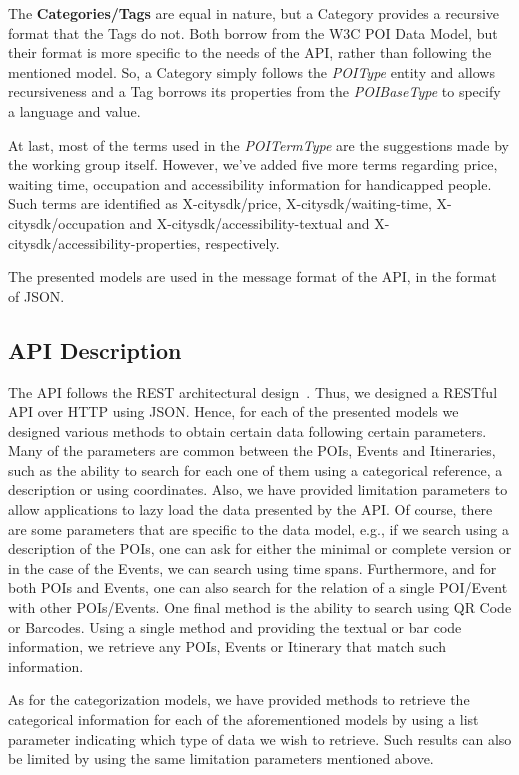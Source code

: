 \documentclass[times,doublespace]{ettauth}%
\begin{document}
The \textbf{Categories/Tags} are equal in nature, but a Category provides a recursive format that the Tags do not. Both borrow from the W3C POI Data Model, but their format is more specific to the needs of the API, rather than following the mentioned model. So, a Category simply follows the \textit{POIType} entity and allows recursiveness and a Tag borrows its properties from the \textit{POIBaseType} to specify a language and value.

At last, most of the terms used in the \textit{POITermType} are the suggestions made by the working group itself. However, we've added five more terms regarding price, waiting time, occupation and accessibility information for handicapped people. Such terms are identified as X-citysdk/price, X-citysdk/waiting-time, X-citysdk/occupation and X-citysdk/accessibility-textual and X-citysdk/accessibility-properties, respectively.

The presented models are used in the message format of the API, in the format of \ac{JSON}.

\subsection{API Description}
\label{s:api-description}
The API follows the \ac{REST} architectural design~\cite{Fielding:2002:PDM:514183.514185}. Thus, we designed a RESTful API over HTTP using JSON. Hence, for each of the presented models we designed various methods to obtain certain data following certain parameters. Many of the parameters are common between the \acp{POI}, Events and Itineraries, such as the ability to search for each one of them using a categorical reference, a description or using coordinates. Also, we have provided limitation parameters to allow applications to lazy load the data presented by the API. Of course, there are some parameters that are specific to the data model, e.g., if we search using a description of the \acp{POI}, one can ask for either the minimal or complete version or in the case of the Events, we can search using time spans. Furthermore, and for both \acp{POI} and Events, one can also search for the relation of a single \ac{POI}/Event with other \acp{POI}/Events. One final method is the ability to search using QR Code or Barcodes. Using a single method and providing the textual or bar code information, we retrieve any POIs, Events or Itinerary that match such information.

As for the categorization models, we have provided methods to retrieve the categorical information for each of the aforementioned models by using a list parameter indicating which type of data we wish to retrieve. Such results can also be limited by using the same limitation parameters mentioned above.
\end{document}
